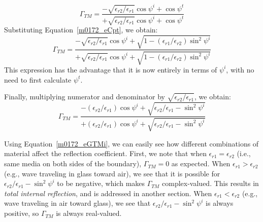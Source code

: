 %
\begin{equation}
\Gamma_{TM} = \frac{-\sqrt{\epsilon_{r2}/\epsilon_{r1}}\cos\psi^i + \cos\psi^t}
                   {+\sqrt{\epsilon_{r2}/\epsilon_{r1}}\cos\psi^i + \cos\psi^t}
\end{equation}
%
Substituting Equation~\ref{m0172_eCpt}, we obtain:
%
\begin{equation}
\Gamma_{TM} = \frac{-\sqrt{\epsilon_{r2}/\epsilon_{r1}}\cos\psi^i+\sqrt{1-\left(\epsilon_{r1}/\epsilon_{r2}\right)\sin^2\psi^i}}
                   {+\sqrt{\epsilon_{r2}/\epsilon_{r1}}\cos\psi^i+\sqrt{1-\left(\epsilon_{r1}/\epsilon_{r2}\right)\sin^2\psi^i}}
\end{equation}
%
This expression has the advantage that it is now entirely in terms of $\psi^i$, with no need to first calculate $\psi^t$.

Finally, multiplying numerator and denominator by $\sqrt{\epsilon_{r2}/\epsilon_{r1}}$, we obtain:
%
\begin{equation}
\boxed{
\Gamma_{TM} = \frac{-\left(\epsilon_{r2}/\epsilon_{r1}\right)\cos\psi^i+\sqrt{\epsilon_{r2}/\epsilon_{r1}-\sin^2\psi^i}}
                   {+\left(\epsilon_{r2}/\epsilon_{r1}\right)\cos\psi^i+\sqrt{\epsilon_{r2}/\epsilon_{r1}-\sin^2\psi^i}}
}
\label{m0172_eGTMi}
\end{equation}

Using Equation~\ref{m0172_eGTMi}, we can easily see how different combinations of material affect the reflection coefficient.
First, we note that when $\epsilon_{r1}=\epsilon_{r2}$ (i.e., same media on both sides of the boundary), $\Gamma_{TM}=0$ as expected.
When $\epsilon_{r1}>\epsilon_{r2}$ (e.g., wave traveling in glass toward air), we see that it is possible for $\epsilon_{r2}/\epsilon_{r1}-\sin^2\psi^i$ to be negative, which makes $\Gamma_{TM}$ complex-valued.  This results in \emph{total internal reflection}, 
and is addressed in another section.
When $\epsilon_{r1}<\epsilon_{r2}$  (e.g., wave traveling in air toward glass), we see that $\epsilon_{r2}/\epsilon_{r1}-\sin^2\psi^i$ is always positive, so $\Gamma_{TM}$ is always real-valued.

